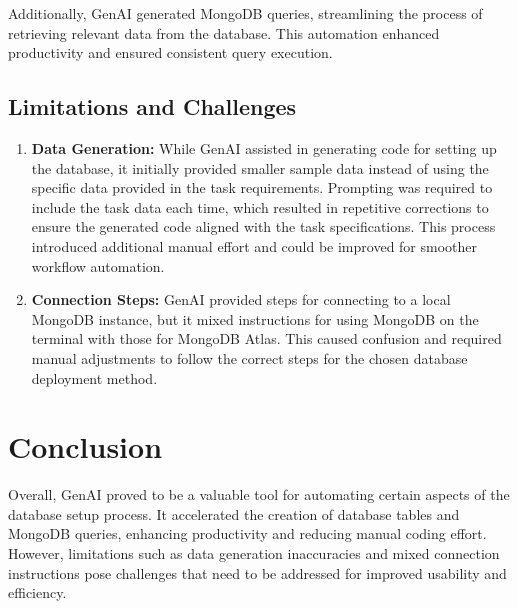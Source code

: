 \documentclass{article}
\begin{document}
Additionally, GenAI generated MongoDB queries, streamlining the process of retrieving relevant data from the database. This automation enhanced productivity and ensured consistent query execution.

\subsection{Limitations and Challenges}
\begin{enumerate}
    \item \textbf{Data Generation:} While GenAI assisted in generating code for setting up the database, it initially provided smaller sample data instead of using the specific data provided in the task requirements. Prompting was required to include the task data each time, which resulted in repetitive corrections to ensure the generated code aligned with the task specifications. This process introduced additional manual effort and could be improved for smoother workflow automation.
    
    \item \textbf{Connection Steps:} GenAI provided steps for connecting to a local MongoDB instance, but it mixed instructions for using MongoDB on the terminal with those for MongoDB Atlas. This caused confusion and required manual adjustments to follow the correct steps for the chosen database deployment method.
\end{enumerate}

\section{Conclusion}
Overall, GenAI proved to be a valuable tool for automating certain aspects of the database setup process. It accelerated the creation of database tables and MongoDB queries, enhancing productivity and reducing manual coding effort. However, limitations such as data generation inaccuracies and mixed connection instructions pose challenges that need to be addressed for improved usability and efficiency.
\end{document}

